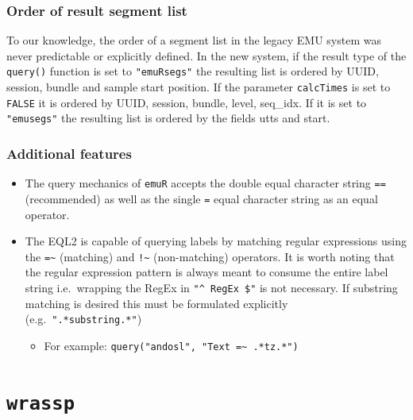 \documentclass[]{book}
\providecommand{\tightlist}{%
  \setlength{\itemsep}{0pt}\setlength{\parskip}{0pt}}
\begin{document}
\hypertarget{order-of-result-segment-list}{%
\subsection{Order of result segment list}\label{order-of-result-segment-list}}

To our knowledge, the order of a segment list in the legacy EMU system was never predictable or explicitly defined. In the new system, if the result type of the \texttt{query()} function is set to \texttt{"emuRsegs"} the resulting list is ordered by UUID, session, bundle and sample start position. If the parameter \texttt{calcTimes} is set to \texttt{FALSE} it is ordered by UUID, session, bundle, level, seq\_idx. If it is set to \texttt{"emusegs"} the resulting list is ordered by the fields utts and start.

\hypertarget{additional-features}{%
\subsection{Additional features}\label{additional-features}}

\begin{itemize}
\tightlist
\item
  The query mechanics of \texttt{emuR} accepts the double equal character string \texttt{==} (recommended) as well as the single \texttt{=} equal character string as an equal operator.
\item
  The EQL2 is capable of querying labels by matching regular expressions using the \texttt{=\textasciitilde{}} (matching) and \texttt{!\textasciitilde{}} (non-matching) operators. It is worth noting that the regular expression pattern is always meant to consume the entire label string i.e.~wrapping the RegEx in \texttt{"\^{}\ RegEx\ \$"} is not necessary. If substring matching is desired this must be formulated explicitly (e.g.~\texttt{".*substring.*"})

  \begin{itemize}
  \tightlist
  \item
    For example: \texttt{query("andosl",\ "Text\ =\textasciitilde{}\ .*tz.*")}
  \end{itemize}
\end{itemize}

\hypertarget{app-chap:wrassp}{%
\chapter{\texorpdfstring{\texttt{wrassp}}{wrassp}}\label{app-chap:wrassp}}
\end{document}
